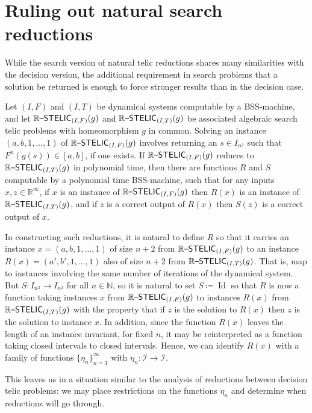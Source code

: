 \documentclass{amsart}
\theoremstyle{theorem}
\theoremstyle{remark}
\DeclareMathOperator{\Id}{Id}
\newcommand{\NN}{\mathbb{N}}
\newcommand{\RR}{\mathbb{R}}
\newcommand{\ccRSTELIC}{\mathbb{R}\textsf{\upshape --STELIC}}
\newcommand{\cI}{\mathcal{I}}
\begin{document}
\section{Ruling out natural search reductions}\label{secSearchRed}

While the search version of natural telic reductions shares many similarities with the decision version, the additional requirement in search problems that a solution be returned is enough to force stronger results than in the decision case.

Let $(I, F)$ and $(I, T)$ be dynamical systems computable by a BSS-machine, and let $\ccRSTELIC_{(I, F)}(g)$ and $\ccRSTELIC_{(I, T)}(g)$ be associated algebraic search telic problems with homeomorphism $g$ in common. Solving an instance $(a, b, 1,\dots,1)$ of $\ccRSTELIC_{(I, F)}(g)$ involves returning an $s \in I_{n^2}$ such that $F^n(g(s)) \in [a, b]$, if one exists.
If $\ccRSTELIC_{(I, F)}(g)$ reduces to $\ccRSTELIC_{(I, T)}(g)$ in polynomial time, then there are functions $R$ and $S$ computable by a polynomial time BSS-machine, such that for any inputs $x, z \in \RR^\infty$, if $x$ is an instance of $\ccRSTELIC_{(I, F)}(g)$ then $R(x)$ is an instance of $\ccRSTELIC_{(I, T)}(g)$, and if $z$ is a correct output of $R(x)$ then $S(z)$ is a correct output of $x$.

In constructing such reductions, it is natural to define $R$ so that it carries an instance $x=(a, b, 1,\dots,1)$ of size $n+2$ from $\ccRSTELIC_{(I, F)}(g)$ to an instance $R(x)=(a',b', 1,\dots,1)$ also of size $n+2$ from $\ccRSTELIC_{(I, T)}(g)$. That is, map to instances involving the same number of iterations of the dynamical system.
But $S:I_{n^2} \rightarrow I_{n^2}$ for all $n \in \NN$, so it is natural to set $S \coloneqq \Id$ so that $R$ is now a function taking instances $x$ from $\ccRSTELIC_{(I, F)}(g)$ to instances $R(x)$ from $\ccRSTELIC_{(I, T)}(g)$ with the property that if $z$ is the solution to $R(x)$ then $z$ is the solution to instance $x$.
In addition, since the function $R(x)$ leaves the length of an instance invariant, for fixed $n$, it may be reinterpreted as a function taking closed intervals to closed intervals. Hence, we can identify $R(x)$ with a family of  functions $\{\eta_n\}_{n=1}^\infty$ with $\eta_n:\cI \rightarrow \cI$.

This leaves us in a situation similar to the analysis of reductions between decision telic problems: we may place restrictions on the functions $\eta_n$ and determine when reductions will go through.
\end{document}
